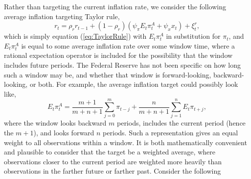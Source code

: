 \documentclass[12pt]{article}
\begin{document}
Rather than targeting the current inflation rate, we consider the following average inflation targeting Taylor rule,
\begin{equation}\label{eq:TaylorRuleAIT}
  r_t = \rho_r r_{t-1} + (1-\rho_r) \left( \psi_\pi E_t \pi_t^A + \psi_x x_t \right) + \xi_t^{r},
\end{equation}
which is simply equation (\ref{eq:TaylorRule}) with $E_t \pi_t^A$ in substitution for $\pi_t$, and $E_t \pi_t^A$ is equal to some average inflation rate over some window time, where a rational expectation operator is included for the possibility that the window includes future periods. The Federal Reserve has not been specific on how long such a window may be, and whether that window is forward-looking, backward-looking, or both. For example, the average inflation target could possibly look like,
\begin{equation}\label{eq:ait}
  E_t \pi_t^A = \frac{m+1}{m+n+1}\sum_{j=0}^{m} \pi_{t-j} + \frac{n}{m+n+1}\sum_{j=1}^{n} E_t \pi_{t+j},
\end{equation}
where the window looks backward $m$ periods, includes the current period (hence the $m+1$), and looks forward $n$ periods. Such a representation gives an equal weight to all observations within a window. It is both mathematically convenient and plausible to consider that the target be a weighted average, where observations closer to the current period are weighted more heavily than observations in the farther future or farther past. Consider the following
\end{document}
